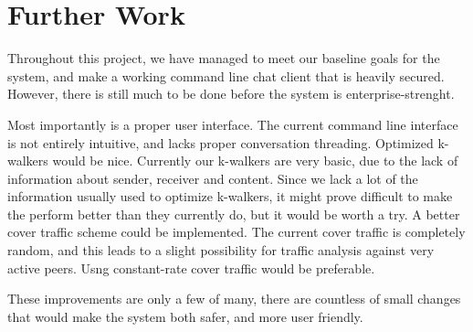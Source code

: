 \section{Further Work}

Throughout this project, we have managed to meet our baseline goals for the system, and make a working command line chat client that is heavily secured. However, there is still much to be done before the system is enterprise-strenght.

Most importantly is a proper user interface. The current command line interface is not entirely intuitive, and lacks proper conversation threading.
Optimized k-walkers would be nice. Currently our k-walkers are very basic, due to the lack of information about sender, receiver and content. Since we lack a lot of the information usually used to optimize k-walkers, it might prove difficult to make the perform better than they currently do, but it would be worth a try.
A better cover traffic scheme could be implemented. The current cover traffic is completely random, and this leads to a slight possibility for traffic analysis against very active peers. Usng constant-rate cover traffic would be preferable.

These improvements are only a few of many, there are countless of small changes that would make the system both safer, and more user friendly.